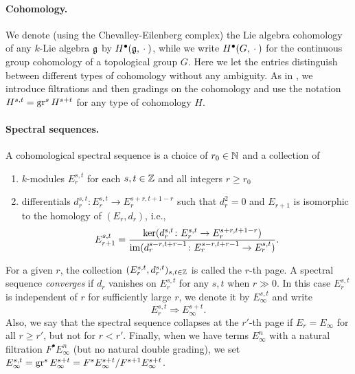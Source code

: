 \paragraph{Cohomology.} We denote (using the Chevalley-Eilenberg complex) the Lie algebra cohomology of any $k$-Lie algebra $\mathfrak{g}$ by $H^{\bullet}(\mathfrak{g}, \:\cdot\:)$, while we write $H^{\bullet}(G,\:\cdot\:)$ for the continuous group cohomology of a topological group $G$. Here we let the entries distinguish between different types of cohomology without any ambiguity. As in , we introduce filtrations and then gradings on the cohomology and use the notation $H^{s,t} = \operatorname{gr}^{s}H^{s+t}$ for any type of cohomology $H$.

\paragraph{Spectral sequences.} A cohomological spectral sequence is a choice of $r_0 \in \mathbb{N}$ and a collection of
\begin{enumerate}[$\bullet$]
  \item $k$-modules $E_r^{s,t}$ for each $s,t \in \mathbb{Z}$ and all integers $r \geq r_0$
  \item differentials $d_r^{s,t} \colon E_r^{s,t} \to E_r^{s+r,t+1-r}$ such that $d_r^2 = 0$ and $E_{r+1}$ is isomorphic to the homology of $(E_r,d_r)$, i.e.,
  \[
    E_{r+1}^{s,t} = \frac{\operatorname{ker}(d_r^{s,t} \colon E_r^{s,t} \to E_r^{s+r,t+1-r})}{\operatorname{im}(d_r^{s-r,t+r-1} \colon E_r^{s-r,t+r-1} \to E_r^{s,t})}.
  \]
\end{enumerate}
For a given $r$, the collection $(E_r^{s,t},d_r^{s,t})_{s,t\in\mathbb{Z}}$ is called the $r$-th page. A spectral sequence \emph{converges} if $d_r$ vanishes on $E_r^{s,t}$ for any $s,t$ when $r\gg0$. In this case $E_r^{s,t}$ is independent of $r$ for sufficiently large $r$, we denote it by $E_{\infty}^{s,t}$ and write
  \[
    E_{r}^{s,t} \Longrightarrow E_\infty^{s+t}.
  \]
Also, we say that the spectral sequence collapses at the $r'$-th page if $E_{r} = E_{\infty}$ for all $r \geq r'$, but not for $r < r'$. Finally, when we have terms $E_\infty^{n}$  with a natural filtration $F^\bullet E_\infty^n$ (but no natural double grading), we set $E_\infty^{s,t} = \operatorname{gr}^{s} E_\infty^{s+t}= F^{s}E_\infty^{s+t}/F^{s+1}E_\infty^{s+t}$.

